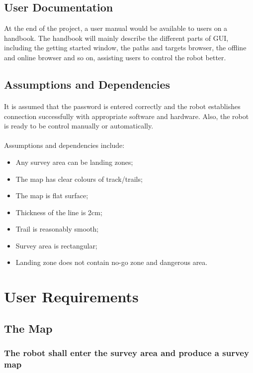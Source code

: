 \documentclass[10pt,a4paper,titlepage]{article}
\begin{document}
\subsection{User Documentation}
At the end of the project, a user manual would be available to users on a handbook. The handbook will mainly describe the different parts of GUI, including the getting started window, the paths and targets browser, the offline and online browser and so on, assisting users to control the robot better.

\subsection{Assumptions and Dependencies}
\paragraph{}
It is assumed that the password is entered correctly and the robot establishes connection successfully with appropriate software and hardware. Also, the robot is ready to be control manually or automatically. 	
\paragraph{}
Assumptions and dependencies include: 
\begin{itemize}
	\item Any survey area can be landing zones;
	\item The map has clear colours of track/trails;
	\item The map is flat surface;
	\item Thickness of the line is 2cm;
	\item Trail is reasonably smooth;
	\item Survey area is rectangular;
	\item Landing zone does not contain no-go zone and dangerous area.
\end{itemize}

	\section{User Requirements}
	\subsection{The Map}
    \subsubsection{The robot shall enter the survey area and produce a survey map}
\end{document}
